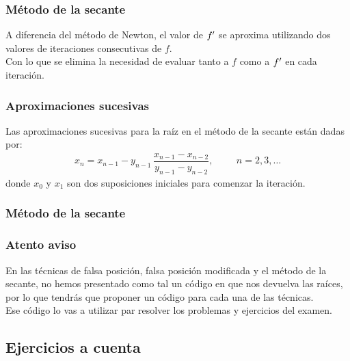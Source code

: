 \documentclass[12pt]{beamer}
\begin{document}
\begin{frame}
\frametitle{Método de la secante}
A diferencia del método de Newton, el valor de ${f}^{\prime}$ se aproxima utilizando dos valores de iteraciones consecutivas de $f$.
\\
\bigskip
\pause
Con lo que se elimina la necesidad de evaluar tanto a $f$ como a ${f}^{\prime}$ en cada iteración.
\end{frame}
\begin{frame}
\frametitle{Aproximaciones sucesivas}
Las aproximaciones sucesivas para la raíz en el método de la secante están dadas por:
\pause
\begin{align*}
x_{n} = x_{n - 1} - y_{n - 1} \, \dfrac{x_{n - 1} - x_{n - 2}}{y_{n - 1}- y_{n - 2}}, \hspace{1cm} n = 2, 3, \ldots
\end{align*}
donde $x_{0}$ y $x_{1}$ son dos suposiciones iniciales para comenzar la iteración.
\end{frame}
\begin{frame}[fragile]
\frametitle{Método de la secante}
\begin{center}
\end{center}
\end{frame}
\begin{frame}
\frametitle{Atento aviso}
En las técnicas de falsa posición, falsa posición modificada y el método de la secante, no hemos presentado como tal un código en \python{} que nos devuelva las raíces, por lo que tendrás que proponer un código para cada una de las técnicas.
\\
\medskip
Ese código lo vas a utilizar par resolver los problemas y ejercicios del examen.
\end{frame}

\subsection{Ejercicios a cuenta}
\end{document}
